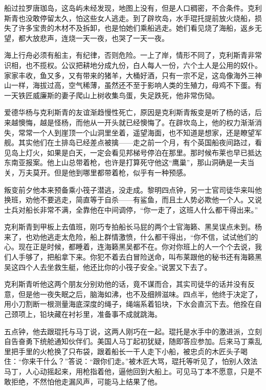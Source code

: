 \par 船过拉罗唐珈岛，这岛屿未经发现，地图上没有，但是人口稠密，不合条件。克利斯青也没敢停留太久，怕这些女人逃走。到了辟坎岛，水手琨托提前放火烧船，损失了许多宝贵的木材不及拆卸，也是怕她们乘船逃走。她们看见烧了海船，返乡无望，都大放悲声，连烧一天一夜，也哭了一天一夜。
\par 海上行舟必须有船主，有纪律，否则危险。一上了岸，情形不同了，克利斯青非常识相，也不揽权。公议把耕地分成九份，白人每人一份，六个土人是公用的奴仆。家家丰收，鱼又多，又有带来的猪羊，大桶好酒，只有一宗不足，这岛像海外三神山一样，海拔过高，空气稀薄，虽然还不至于影响人类的生殖力，母鸡不下蛋。有一天铁匠威廉斯的妻子爬山上树收集鸟蛋，失足跌死，他非常伤恸。
\par 爱德华杨与克利斯青的友谊渐趋慢性死亡，原因是克利斯青叛变是听了杨的话，后来越懊悔，越是怪杨，而他从一开头就已经懊悔了。在辟坎岛上，他的权力渐渐消失，常常一个人到崖顶一个山洞里坐着，遥望海面，也不知道是想家，还是瞭望军舰。其实他们在土排岛已经差点被擒——走之前一个月，有个英国船夜间路过，看见岛上灯火，如果是白天，一定会看见邦梯号停泊在那里。那时候布莱也早已抵达东南亚报案。他上山总带着枪，也许是打算死守他这“鹰巢”，那山洞确是一夫当关，万夫莫开。但是他到哪里都带着枪，似乎有一种预感。
\par 叛变前夕他本来预备乘小筏子潜逃，没走成。黎明四点钟，另一士官司徒华来叫他换班，劝他不要逃走，简直等于自杀——有鲨鱼，而且土人势必欺他一个人。又说士兵对船长非常不满，全靠他在中间调停，“你一走了，这班人什么都干得出来。”
\par 克利斯青到甲板上去值班，刚巧专拍船长马屁的两个士官海籁、黑吴误点未到。杨来了，也劝他逃走太危险，船上群情激愤，什么都干得出，“你不信，试试他们的心。现在正是时候，都睡着，连海籁黑吴都不在。你对你班上的人一个个去说，我们人手够了，把船拿下来。你犯不着去白冒险送命，叫布莱跟他的秘书还有海籁黑吴这四个人去坐救生艇，他还比你的小筏子安全。”说罢又下去了。
\par 克利斯青听他这两个朋友分别劝他的话，竟不谋而合，其实司徒华的话并没有反意，但是他一夜失眠之后，脑海如沸，也不及细辨滋味。四点半，他终于决定了，用小刀割断一根测量海底深度的绳子，绳端系着铅块，下水会直沉下去。他拴在自己颈项上，铅块藏在衬衫里，准备事不成就跳海。
\par 五点钟，他去跟琨托与马丁说，这两人刚巧在一起。琨托是水手中的激进派，立刻自告奋勇下统舱通知伙伴们。美国人马丁起初犹疑，随即答应参加。后来马丁乘乱里把手里的火枪换了只布袋，跟着船长一干人走下小船，被忠贞的木匠头子喝住：“你来干什么？”答说：“跟你们走。”被木匠大骂，琨托等听见了，怕别人效法马丁，人心动摇起来，用枪指着他，逼他回到大船上。可见马丁本不愿意，只是不敢拒绝，不然怕他走漏风声，可能马上结果了他。
